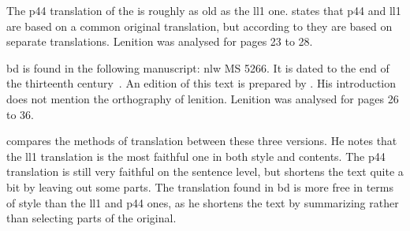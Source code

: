 The \gls{p44} translation of the  is roughly as old as the \gls{ll1} one.
\Textcite{lewis_brut_1942}  states that \gls{p44} and \gls{ll1} are based on a common original translation,
but according to \textcite[xliii--xliv]{roberts_astudiaeth_1969}  they are based on separate translations.
Lenition was analysed for pages 23 to 28.

\Gls{bd} is found in the following manuscript: \gls{nlw} MS 5266.
It is dated to the end of the thirteenth century~\autocite[xliii]{roberts_astudiaeth_1969}.
An edition of this text is prepared by \textcite{lewis_brut_1942}.
His introduction does not mention the orthography of lenition.
Lenition was analysed for pages 26 to 36.

\Textcite{bowen_testunau_1974} compares the methods of translation between these three versions.
He notes that the \gls{ll1} translation is the most faithful one in both style and contents.
The \gls{p44} translation is still very faithful on the sentence level, but shortens the text quite a bit by leaving out some parts.
The translation found in \gls{bd} is more free in terms of style than the \gls{ll1} and \gls{p44} ones, as he shortens the text by summarizing rather than selecting parts of the original.
